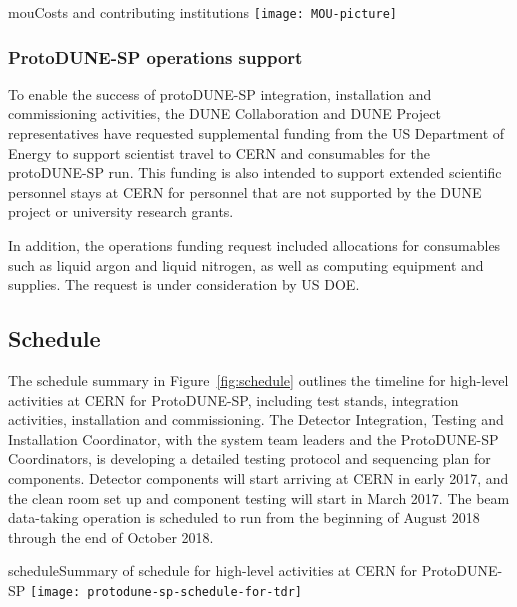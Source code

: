 \begin{cdrfigure}{mou}{Costs and contributing institutions}
\texttt{[image: MOU-picture]}
\end{cdrfigure}

\subsubsection{ProtoDUNE-SP operations support}
To enable the success of protoDUNE-SP integration, installation and commissioning activities, the DUNE Collaboration and DUNE Project representatives have requested supplemental funding from the US Department of Energy to support scientist travel to CERN and consumables for the protoDUNE-SP run.  This funding is also intended to support extended scientific personnel stays at CERN for personnel that are not supported by the DUNE project or university research grants. 

In addition, the operations funding request included allocations for consumables such as liquid argon and liquid nitrogen, as well as computing equipment and supplies.  The request is under consideration by US DOE.

\subsection{Schedule}

The schedule summary in Figure~\ref{fig:schedule} outlines the timeline for high-level activities at CERN for ProtoDUNE-SP, including test stands, integration activities, installation and commissioning.  The Detector Integration, Testing and Installation Coordinator, with the system team leaders and the ProtoDUNE-SP Coordinators, is developing a detailed testing protocol and sequencing plan for components.  Detector components will start arriving at CERN in early 2017, and the clean room set up and component testing will start in March 2017. The beam data-taking operation is scheduled to run from the beginning of August 2018 through the end of October 2018.

\begin{cdrfigure}{schedule}{Summary of schedule for high-level activities at CERN for ProtoDUNE-SP}
\texttt{[image: protodune-sp-schedule-for-tdr]}
\end{cdrfigure}